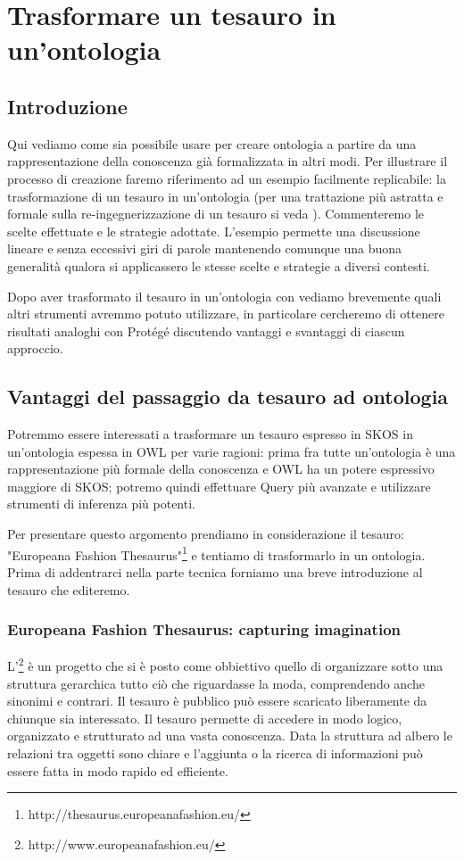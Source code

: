 \chapter{Trasformare un tesauro in un'ontologia}\label{ch3}
\section*{Introduzione}
Qui vediamo come sia possibile usare \cduce per creare ontologia a partire da una rappresentazione della conoscenza già formalizzata in altri modi. Per illustrare il processo di creazione faremo riferimento ad un esempio facilmente replicabile: la trasformazione di un tesauro in un'ontologia (per una trattazione più astratta e formale sulla re-ingegnerizzazione di un tesauro si veda \cite{re_engineeringThesaurus}). Commenteremo le scelte effettuate e le strategie adottate. L'esempio permette una discussione lineare e senza eccessivi giri di parole mantenendo comunque una buona generalità qualora si applicassero le stesse scelte e strategie a diversi contesti.

Dopo aver trasformato il tesauro in un'ontologia con \cduce vediamo brevemente quali altri strumenti avremmo potuto utilizzare, in particolare cercheremo di ottenere risultati analoghi con Protégé discutendo vantaggi e svantaggi di ciascun approccio.

\section{Vantaggi del passaggio da tesauro ad ontologia}
Potremmo essere interessati a trasformare un tesauro espresso in SKOS in un'ontologia espessa in OWL per varie ragioni: prima fra tutte un'ontologia è una rappresentazione più formale della conoscenza e OWL ha un potere espressivo maggiore di SKOS; potremo quindi effettuare Query più avanzate e utilizzare strumenti di inferenza più potenti.

Per presentare questo argomento prendiamo in considerazione il tesauro: "Europeana Fashion Thesaurus"\footnote{http://thesaurus.europeanafashion.eu/} e tentiamo di trasformarlo in un ontologia. Prima di addentrarci nella parte tecnica forniamo una breve introduzione al tesauro che editeremo.
\subsection{Europeana Fashion Thesaurus: capturing imagination}
L'\footnote{http://www.europeanafashion.eu/} è un progetto che si è posto come obbiettivo quello di organizzare sotto una struttura gerarchica tutto ciò che riguardasse la moda, comprendendo anche sinonimi e contrari. Il tesauro è pubblico può essere scaricato liberamente da chiunque sia interessato. Il tesauro permette di accedere in modo logico, organizzato e strutturato ad una vasta conoscenza. Data la struttura ad albero le relazioni tra oggetti sono chiare e l'aggiunta o la ricerca di informazioni può essere fatta in modo rapido ed efficiente.
